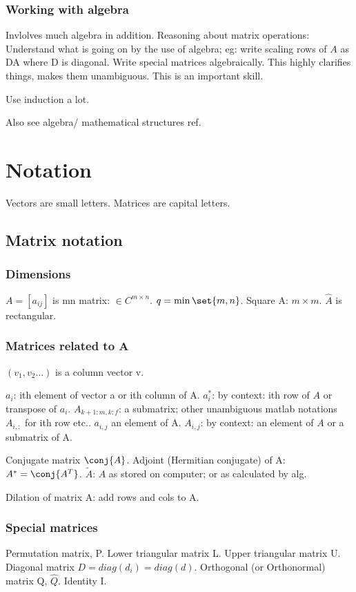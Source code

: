 \documentclass[oneside, article]{memoir}
\begin{document}
\subsection{Working with algebra}
Invlolves much algebra in addition. Reasoning about matrix operations: Understand what is going on by the use of algebra; eg: write scaling rows of $A$ as DA where D is diagonal. Write special matrices algebraically. This highly clarifies things, makes them unambiguous. This is an important skill.

Use induction a lot.

Also see algebra/ mathematical structures ref.

\chapter{Notation}
Vectors are small letters. Matrices are capital letters.

\section{Matrix notation}
\subsection{Dimensions}
$A = [a_{ij}]$ is mn matrix: $\in C^{m \times n}$. $q = \min \set{m,n}$. Square A: $m \times m$. $\hat{A}$ is rectangular.

\subsection{Matrices related to A}
$(v_{1}, v_{2} \dots)$ is a column vector v.

$a_{i}$: ith element of vector a or ith column of A. $a_{i}^{*}$: by context: ith row of $A$ or transpose of $a_{i}$. $A_{k+1:m,k:f}$: a submatrix; other unambiguous matlab notations $A_{i,:}$ for ith row etc.. $a_{i,j}$ an element of A. $A_{i,j}$: by context: an element of $A$ or a submatrix of A. 

Conjugate matrix $\conj{A}$. Adjoint (Hermitian conjugate) of A: $A^{*}=\conj{A^{T}}$. $\tilde{A}$: $A$ as stored on computer; or as calculated by alg.

Dilation of matrix A: add rows and cols to A.

\subsection{Special matrices}
Permutation matrix, P. Lower triangular matrix L. Upper triangular matrix U. Diagonal matrix $D = diag(d_{i}) = diag(d)$. Orthogonal (or Orthonormal) matrix Q, $\hat{Q}$. Identity I.
\end{document}
